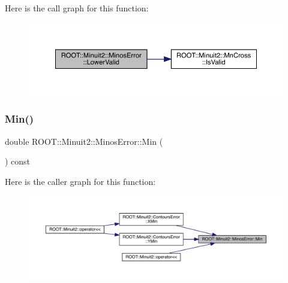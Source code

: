 Here is the call graph for this function\+:
\nopagebreak
\begin{figure}[H]
\begin{center}
\leavevmode
\includegraphics[width=350pt]{d2/dd1/classROOT_1_1Minuit2_1_1MinosError_a4b8c37c90bb53d98d3b4364a5ebc2228_cgraph}
\end{center}
\end{figure}
\mbox{\label{classROOT_1_1Minuit2_1_1MinosError_a109ad5c9e19a97bda32f506718eaef02}} 
\subsubsection{\texorpdfstring{Min()}{Min()}\hspace{0.1cm}{\footnotesize\ttfamily [1/2]}}
{\footnotesize\ttfamily double R\+O\+O\+T\+::\+Minuit2\+::\+Minos\+Error\+::\+Min (\begin{DoxyParamCaption}{ }\end{DoxyParamCaption}) const\hspace{0.3cm}{\ttfamily [inline]}}

Here is the caller graph for this function\+:\nopagebreak
\begin{figure}[H]
\begin{center}
\leavevmode
\includegraphics[width=350pt]{d2/dd1/classROOT_1_1Minuit2_1_1MinosError_a109ad5c9e19a97bda32f506718eaef02_icgraph}
\end{center}
\end{figure}
\mbox{\label{classROOT_1_1Minuit2_1_1MinosError_a109ad5c9e19a97bda32f506718eaef02}} 
